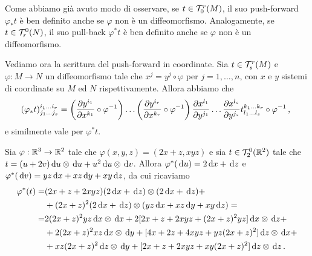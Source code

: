 \begin{remark}
	Come abbiamo già avuto modo di osservare, se $t\in\mathcal T_0^r(M)$, il suo push-forward $\varphi_*t$ è ben definito anche se $\varphi$ non è un diffeomorfismo. Analogamente, se $t \in \mathcal T_r^0(N)$, il suo pull-back $\varphi^*t$ è ben definito anche se $\varphi$ non è un diffeomorfismo.
\end{remark}

Vediamo ora la scrittura del push-forward in coordinate. Sia $t\in \mathcal T_s^r(M)$ e $\varphi:M\to N$ un diffeomorfismo tale che $x^j = y^j\circ \varphi$ per $j=1,\ldots,n$, con $x$ e $y$ sistemi di coordinate su $M$ ed $N$ rispettivamente. Allora abbiamo che %
\begin{equation*}
	(\varphi_*t)_{j_1\ldots j_s}^{i_1\ldots i_r} =\left(\frac{\partial y^{i_1}}{\partial x^{k_1}}\circ \varphi^{-1}\right)\dots \left(\frac{\partial y^{i_r}}{\partial x^{k_r}} \circ \varphi^{-1}\right) \frac{\partial x^{l_1}}{\partial y^{j_1}} \dots \frac{\partial x^{l_s}}{\partial y^{j_s}} t_{l_1\ldots l_s}^{k_1\ldots k_r} \circ \varphi^{-1} \, \text{, }
\end{equation*}
e similmente vale per $\varphi^*t$.



\begin{example}
	Sia $\varphi:\mathbb R^3\to\mathbb R^2$ tale che $\varphi(x,y,z) = (2x+z,xyz)$ e sia $t\in \mathcal T_2^0(\mathbb R^2)$ tale che $t = (u+2v)\,\mathrm d u\otimes \,\mathrm d u + u^2 \,\mathrm d u \otimes \,\mathrm d v$.
	Allora $\varphi^*(\,\mathrm d u) = 2\,\mathrm d x +\,\mathrm d z$ e $\varphi^*(\,\mathrm d v) = yz \,\mathrm d x + xz \,\mathrm d y + xy \,\mathrm d z$, da cui ricaviamo
	\begin{align*}
	\varphi^*(t) =& (2x+z + 2xyz) (2\,\mathrm d x + \,\mathrm d z) \otimes (2\,\mathrm d x + \,\mathrm d z)+ \\
	&+ (2x+z)^2 (2\,\mathrm d x + \,\mathrm d z) \otimes (yz \,\mathrm d x + xz \,\mathrm d y + xy \,\mathrm d z) = \\
	=&2 (2x+z)^2 yz \,\mathrm d x \otimes \,\mathrm d x +  2 [2x + z + 2xyz + (2x + z)^2 yz] \,\mathrm d x \otimes \,\mathrm d z  +\\
	&+ 2 (2x+z)^2 xz \,\mathrm d x \otimes \,\mathrm d y + [4x + 2z + 4xyz + yz (2x+z)^2] \,\mathrm d z \otimes \,\mathrm d x +  \\
        &+ xz (2x+z)^2 \,\mathrm d z \otimes \,\mathrm d y + [2x + z + 2xyz + xy (2x+z)^2] \,\mathrm d z \otimes \,\mathrm d z \, \text{. }
	\end{align*}
\end{example}
